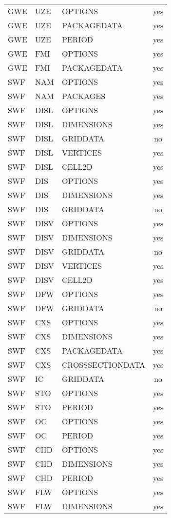 \begin{longtable}{p{1.5cm} p{1.5cm} p{3cm} c}
\hline
GWE & UZE & OPTIONS & yes \\ 
GWE & UZE & PACKAGEDATA & yes \\ 
GWE & UZE & PERIOD & yes \\ 
\hline
GWE & FMI & OPTIONS & yes \\ 
GWE & FMI & PACKAGEDATA & yes \\ 
\hline
SWF & NAM & OPTIONS & yes \\ 
SWF & NAM & PACKAGES & yes \\ 
\hline
SWF & DISL & OPTIONS & yes \\ 
SWF & DISL & DIMENSIONS & yes \\ 
SWF & DISL & GRIDDATA & no \\ 
SWF & DISL & VERTICES & yes \\ 
SWF & DISL & CELL2D & yes \\ 
\hline
SWF & DIS & OPTIONS & yes \\ 
SWF & DIS & DIMENSIONS & yes \\ 
SWF & DIS & GRIDDATA & no \\ 
\hline
SWF & DISV & OPTIONS & yes \\ 
SWF & DISV & DIMENSIONS & yes \\ 
SWF & DISV & GRIDDATA & no \\ 
SWF & DISV & VERTICES & yes \\ 
SWF & DISV & CELL2D & yes \\ 
\hline
SWF & DFW & OPTIONS & yes \\ 
SWF & DFW & GRIDDATA & no \\ 
\hline
SWF & CXS & OPTIONS & yes \\ 
SWF & CXS & DIMENSIONS & yes \\ 
SWF & CXS & PACKAGEDATA & yes \\ 
SWF & CXS & CROSSSECTIONDATA & yes \\ 
\hline
SWF & IC & GRIDDATA & no \\ 
\hline
SWF & STO & OPTIONS & yes \\ 
SWF & STO & PERIOD & yes \\ 
\hline
SWF & OC & OPTIONS & yes \\ 
SWF & OC & PERIOD & yes \\ 
\hline
SWF & CHD & OPTIONS & yes \\ 
SWF & CHD & DIMENSIONS & yes \\ 
SWF & CHD & PERIOD & yes \\ 
\hline
SWF & FLW & OPTIONS & yes \\ 
SWF & FLW & DIMENSIONS & yes \\ 

\end{longtable}
